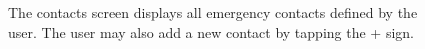 \documentclass[12pt, a4paper, onecolumn]{article}
\begin{document}
	\begin{figure}[H]
		\centering
		\caption{The contacts screen displays all emergency contacts defined by the user. The user may also add a new contact by tapping the + sign.}%
		\label{fig:contacts-screen}%
	\end{figure}
\end{document}
